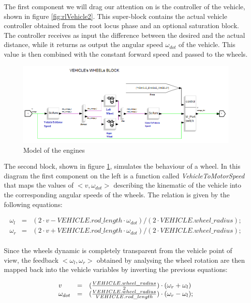 The first component we will drag our attention on is the controller of the vehicle, shown in figure \ref{fig:rlVehicle2}. This super-block contains the actual vehicle controller obtained from the root locus phase and an optional saturation block. The controller receives as input the difference between the desired and the actual distance, while it returns as output the angular speed $\omega_{dot}$ of the vehicle. This value is then combined with the constant forward speed and passed to the wheels.

\begin{figure}[H]
  \begin{center}
  \includegraphics[scale=0.49]{FIGURES_3/Wheels_Block.png}
    \caption[]{Model of the engines}
    \label{fig:rlVehicle3}
  \end{center}
\end{figure}

The second block, shown in figure \ref{fig:rlVehicle3}, simulates the behaviour of a wheel. In this diagram the first component on the left is a function called \textit{VehicleToMotorSpeed} that maps the values of $<v, \omega_{dot}>$ describing the kinematic of the vehicle into the corresponding angular speeds of the wheels. The relation is given by the following equations:

\[
\begin{array}{lcl}
		\omega_l & = & (2\cdot{}v - VEHICLE.rod\_length\cdot{}\omega_{dot})/(2\cdot{}VEHICLE.wheel\_radius);\\
   		\omega_r & = & (2\cdot{}v + VEHICLE.rod\_length\cdot{}\omega_{dot})/(2\cdot{}VEHICLE.wheel\_radius);\\
\end{array}
\]

Since the wheels dynamic is completely transparent from the vehicle point of view, the feedback $<\omega_l, \omega_r>$ obtained by analysing the wheel rotation are then mapped back into the vehicle variables by inverting the previous equations:

\[
\begin{array}{lcl}
v &= &({VEHICLE.wheel\_radius \over{} 2}) \cdot{} (\omega_r + \omega_l)\\
\omega_{dot} &= &({VEHICLE.wheel\_radius \over{} VEHICLE.rod\_length}) \cdot (\omega_r - \omega_l);\\
\end{array}
\]


